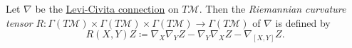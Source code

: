 \begin{definition}\label{def:Riemannian-curvature-tensor}
	Let \(\nabla \) be the \hyperref[def:Levi-Civita-connection]{Levi-Civita connection} on \(T \mathcal{M} \). Then the \emph{Riemannian curvature tensor} \(R\colon \Gamma (T \mathcal{M} ) \times \Gamma (T \mathcal{M} )\times \Gamma (T \mathcal{M} ) \to \Gamma (T \mathcal{M} )\) of \(\nabla \) is defined by
	\[
		R(X, Y)Z \coloneqq \nabla _X \nabla _Y Z - \nabla _Y \nabla _X Z - \nabla _{[X, Y]}Z.
	\]
\end{definition}
